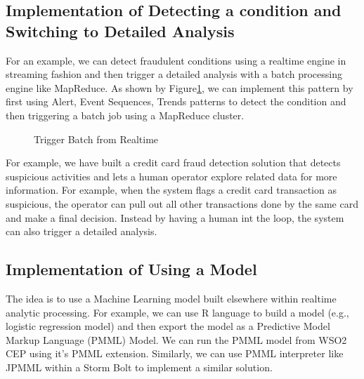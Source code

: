 \documentclass{sig-alternate}
\begin{document}
{%





\subsection{Implementation of Detecting a condition and Switching to Detailed Analysis}
For an example, we can detect fraudulent conditions using a realtime engine in streaming fashion and then trigger a detailed analysis with a batch processing engine like MapReduce. As shown by Figure\ref{fig:q4}, we can implement this pattern by first using Alert, Event Sequences, Trends patterns to detect the condition and then triggering a batch job using a MapReduce cluster. 

\begin{figure}[!htbp]
\centering
{}
\caption{Trigger Batch from Realtime}
\label{fig:q4}
\end{figure}

For example, we have built a credit card fraud detection solution that detects suspicious activities and lets a human operator explore related data for more information. For example, when the system flags a credit card transaction as suspicious, the operator can pull out all other transactions done by the same card and make a final decision. Instead by having a human int the loop, the system can also trigger a detailed analysis. 



\subsection{Implementation of Using a Model}

The idea is to use a Machine Learning model built elsewhere within realtime analytic processing. For example, we can use R language to build a model (e.g., logistic regression model) and then export the model as a Predictive Model Markup Language (PMML) Model. We can run the PMML model from WSO2 CEP using it's PMML extension. Similarly, we can use PMML interpreter like JPMML within a Storm Bolt to implement a similar solution. 

}
\end{document}
